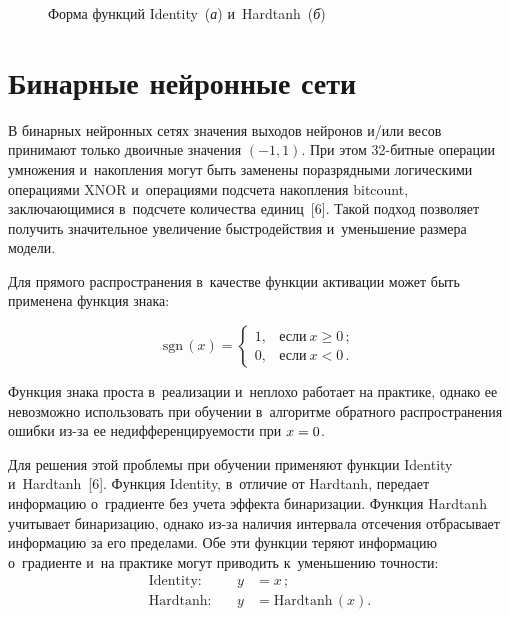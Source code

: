 \begin{multicols}{2}
\begin{figure*}
\begin{center}
\vspace*{6pt}

  {\small Форма функций Identity~(\textit{а}) и~Hardtanh~(\textit{б})}
  \end{center}
  \end{figure*}
  
  \vspace*{-9pt}
  
\section{Бинарные нейронные сети}

  В бинарных нейронных сетях значения выходов нейронов и/или весов 
принимают только двоичные значения $(-1, 1)$. При этом 32-бит\-ные операции 
умножения и~на\-коп\-ле\-ния могут быть заменены поразрядными логическими 
операциями XNOR и~операциями под\-сче\-та накопления bitcount, 
за\-клю\-ча\-ющи\-ми\-ся в~подсчете количества единиц~[6]. Такой подход поз\-во\-ля\-ет 
получить значительное увеличение быст\-ро\-дей\-ст\-вия и~уменьшение размера 
мо\-дели.
  
  Для прямого распространения в~качестве функции активации может быть 
применена функ\-ция \mbox{знака}:

\noindent
  \begin{equation*}
  \mathrm{sgn}\,(x)= \begin{cases}
  1, &\mbox{если}\ x\geq 0\,;\\
  0, & \mbox{если}\ x<0\,.
  \end{cases}
  \end{equation*}
  
  Функция знака прос\-та в~реализации и~неплохо работает на прак\-ти\-ке, однако 
ее не\-воз\-мож\-но использовать при обуче\-нии в~алгоритме обрат\-но\-го 
рас\-про\-стра\-не\-ния ошиб\-ки из-за ее не\-диф\-фе\-рен\-ци\-ру\-емости при $x\hm = 0$.
  
  Для решения этой проб\-ле\-мы при обуче\-нии применяют функции Identity 
и~Hardtanh~[6]. Функция Identity, в~отличие от Hardtanh, передает информацию 
о~градиенте без учета эффекта бинаризации. Функция Hardtanh учитывает 
бинаризацию, однако из-за наличия интервала отсечения от\-бра\-сы\-ва\-ет 
информацию за его пределами. Обе эти функции теряют информацию 
о~градиенте и~на прак\-ти\-ке могут приводить к~уменьшению точ\-ности: 
  \begin{alignat*}{2}
  \mbox{Identity}:&\ &y&=x\,;\\[6pt]
  \mbox{Hardtanh}:&\ &y&=\mathrm{Hardtanh}\,(x).
  \end{alignat*}
  

\end{multicols}

